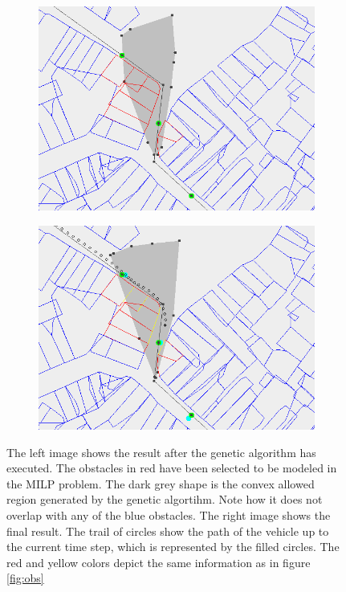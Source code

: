 \begin{figure}[!t]
    \centering
    \begin{subfigure}[t]{0.47\textwidth}
        \includegraphics[width=\textwidth]{img/pre3}
    \end{subfigure}
    \hfil
    \begin{subfigure}[t]{0.47\textwidth}
        \includegraphics[width=\textwidth]{img/pre4}
    \end{subfigure}
    \caption{The left image shows the result after the genetic algorithm has executed. The obstacles in red have been selected to be modeled in the MILP problem. The dark grey shape is the convex allowed region generated by the genetic algortihm. Note how it does not overlap with any of the blue obstacles. The right image shows the final result. The trail of circles show the path of the vehicle up to the current time step, which is represented by the filled circles. The red and yellow colors depict the same information as in figure \ref{fig:obs}}\label{fig:pre-3-4}
\end{figure}

